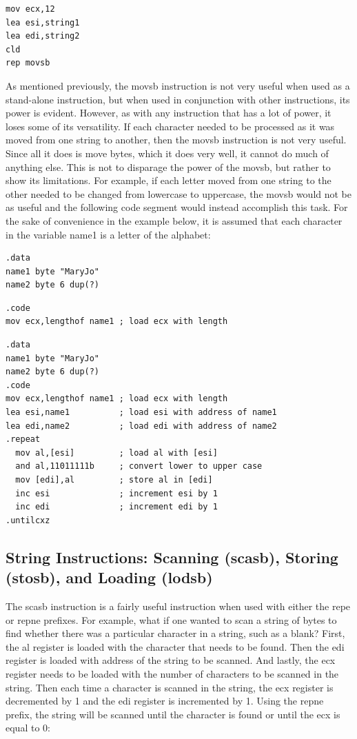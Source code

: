 \documentclass[10pt]{book}
\begin{document}
\begin{verbatim}
mov ecx,12
lea esi,string1
lea edi,string2
cld
rep movsb
\end{verbatim}

As mentioned previously, the movsb instruction is not very useful when used as a stand-alone instruction, but when used in conjunction with other instructions, its power is evident. However, as with any instruction that has a lot of power, it loses some of its versatility. If each character needed to be processed as it was moved from one string to another, then the movsb instruction is not very useful. Since all it does is move bytes, which it does very well, it cannot do much of anything else. This is not to disparage the power of the movsb, but rather to show its limitations. For example, if each letter moved from one string to the other needed to be changed from lowercase to uppercase, the movsb would not be as useful and the following code segment would instead accomplish this task. For the sake of convenience in the example below, it is assumed that each character in the variable name1 is a letter of the alphabet:

\begin{verbatim}
.data
name1 byte "MaryJo"
name2 byte 6 dup(?)
\end{verbatim}

\begin{verbatim}
.code
mov ecx,lengthof name1 ; load ecx with length
\end{verbatim}
\begin{verbatim}
.data
name1 byte "MaryJo"
name2 byte 6 dup(?)
.code
mov ecx,lengthof name1 ; load ecx with length
lea esi,name1          ; load esi with address of name1
lea edi,name2          ; load edi with address of name2
.repeat
  mov al,[esi]         ; load al with [esi]
  and al,11011111b     ; convert lower to upper case
  mov [edi],al         ; store al in [edi]
  inc esi              ; increment esi by 1
  inc edi              ; increment edi by 1
.untilcxz
\end{verbatim}

\subsection{String Instructions: Scanning (scasb), Storing (stosb), and Loading (lodsb)}
The scasb instruction is a fairly useful instruction when used with either the repe or repne prefixes. For example, what if one wanted to scan a string of bytes to find whether there was a particular character in a string, such as a blank? First, the al register is loaded with the character that needs to be found. Then the edi register is loaded with address of the string to be scanned. And lastly, the ecx register needs to be loaded with the number of characters to be scanned in the string. Then each time a character is scanned in the string, the ecx register is decremented by 1 and the edi register is incremented by 1. Using the repne prefix, the string will be scanned until the character is found or until the ecx is equal to 0:
\end{document}
